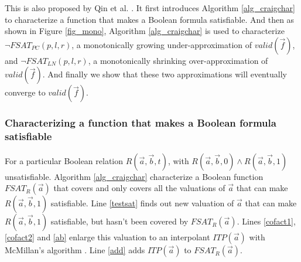 

This is also proposed by Qin et al. \cite{QinTODAES15}.
It first introduces Algorithm \ref{alg_craigchar} to characterize a function
that makes a Boolean formula satisfiable.
And then as shown in Figure \ref{fig_mono},
Algorithm \ref{alg_craigchar} is used to characterize $\neg FSAT_{PC}(p,l,r)$,
a monotonically growing under-approximation of $valid(\vec{f})$,
and $\neg FSAT_{LN}(p,l,r)$,
a monotonically shrinking over-approximation of $valid(\vec{f})$.
And finally we show that these two approximations will eventually converge to $valid(\vec{f})$.



\subsubsection{Characterizing a function that makes a Boolean formula satisfiable}\label{subsubsec_craig}

For a particular Boolean relation $R(\vec{a},\vec{b},t)$,
with $R(\vec{a},\vec{b},0)\wedge R(\vec{a},\vec{b},1)$ unsatisfiable.
Algorithm \ref{alg_craigchar} characterize a Boolean function $FSAT_R(\vec{a})$
that covers and only covers all the valuations of $\vec{a}$
that can make $R(\vec{a},\vec{b},1)$ satisfiable.
Line \ref{testsat} finds out new valuation of $\vec{a}$ that can make $R(\vec{a},\vec{b},1)$ satisfiable,
but hasn't been covered by $FSAT_R(\vec{a})$.
Lines \ref{cofact1}, \ref{cofact2} and \ref{ab} enlarge this valuation
to an interpolant $ITP(\vec{a})$ with McMillan's algorithm \cite{interp_McMillan}.
Line \ref{add} adds $ITP(\vec{a})$ to $FSAT_R(\vec{a})$.

%


